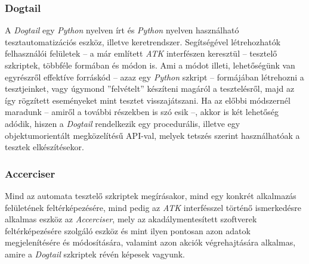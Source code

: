 \subsubsection{Dogtail}

A \textit{Dogtail} egy \textit{Python} nyelven írt és \textit{Python} nyelven használható tesztautomatizációs eszköz, illetve keretrendszer. Segítségével létrehozhatók felhasználói felületek -- a már említett \textit{ATK} interfészen keresztül -- tesztelő szkriptek, többféle formában és módon is. Ami a módot illeti, lehetőségünk van egyrészről effektíve forráskód -- azaz egy \textit{Python} szkript -- formájában létrehozni a tesztjeinket, vagy úgymond ''felvételt'' készíteni magáról a tesztelésről, majd az így rögzített eseményeket mint tesztet visszajátszani. Ha az előbbi módszernél maradunk -- amiről a további részekben is szó esik --, akkor is két lehetőség adódik, hiszen a \textit{Dogtail} rendelkezik egy procedurális, illetve egy objektumorientált megközelítésű API-val, melyek tetszés szerint használhatóak a tesztek elkészítésekor.

\subsubsection{Accerciser}

Mind az automata tesztelő szkriptek megírásakor, mind egy konkrét alkalmazás felületének feltérképezésére, mind pedig az \textit{ATK} interfésszel történő ismerkedésre alkalmas eszköz az \textit{Accerciser}, mely az akadálymentesített szoftverek feltérképezésére szolgáló eszköz és mint ilyen pontosan azon adatok megjelenítésére és módosítására, valamint azon akciók végrehajtására alkalmas, amire a \textit{Dogtail} szkriptek révén képesek vagyunk.
